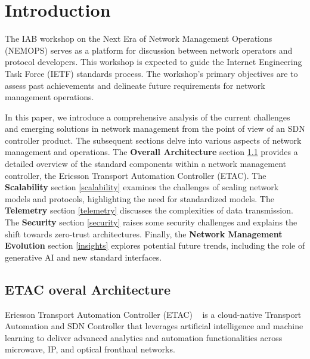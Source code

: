 \documentclass[10pt,sigconf]{iabart}
\begin{document}

\maketitle

\section{Introduction} \label{introduction}

The IAB workshop on the Next Era of Network Management Operations (NEMOPS) serves as a platform for discussion between network operators and protocol developers. This workshop is expected to guide the Internet Engineering Task Force (IETF) standards process. The workshop's primary objectives are to assess past achievements and delineate future requirements for network management operations.

In this paper, we introduce a comprehensive analysis of the current challenges and emerging solutions in network management from the point of view of an SDN controller product. The subsequent sections delve into various aspects of network management and operations. The \textbf{Overall Architecture} section \ref{overview} provides a detailed overview of the standard components within a network management controller, the Ericsson Transport Automation Controller (ETAC). The \textbf{Scalability} section \ref{scalability} examines the challenges of scaling network models and protocols, highlighting the need for standardized models. The \textbf{Telemetry} section \ref{telemetry} discusses the complexities of data transmission. The \textbf{Security} section \ref{security} raises some security challenges and explains the shift towards zero-trust architectures. Finally, the \textbf{Network Management Evolution} section \ref{insights} explores potential future trends, including the role of generative AI and new standard interfaces.

\subsection{ETAC overal Architecture} \label{overview}

Ericsson Transport Automation Controller (ETAC) ~\cite{ericsson-etac} is a cloud-native Transport Automation and SDN Controller that leverages artificial intelligence and machine learning to deliver advanced analytics and automation functionalities across microwave, IP, and optical fronthaul networks.
\end{document}

